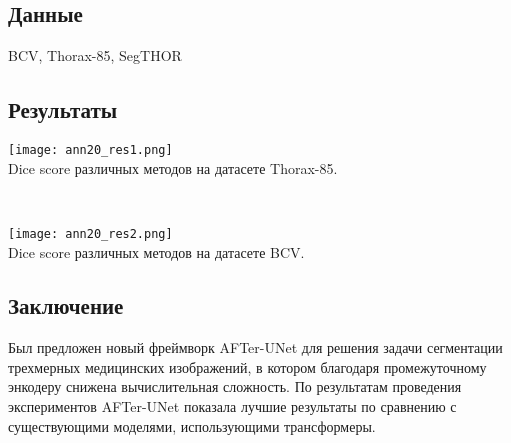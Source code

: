 \subsection*{Данные}
BCV, Thorax-85, SegTHOR
\subsection*{Результаты}

\begin{minipage}{1.0\linewidth}
    \begin{center}
        \texttt{[image: ann20\_res1.png]} \\
        \caption{\scriptsize{
            Dice score различных методов на датасете Thorax-85.
        }}
    \end{center}
    
\end{minipage}
\\
\begin{minipage}{1.0\linewidth}
    \begin{center}
        \texttt{[image: ann20\_res2.png]} \\
        \caption{\scriptsize{ 
            Dice score различных методов на датасете BCV.}}
    \end{center}
    
\end{minipage} 

\subsection*{Заключение}
Был предложен новый фреймворк AFTer-UNet для решения задачи сегментации 
трехмерных медицинских изображений, в котором благодаря промежуточному энкодеру
снижена вычислительная сложность. По результатам проведения экспериментов 
AFTer-UNet показала лучшие результаты по сравнению с существующими моделями, использующими
трансформеры.